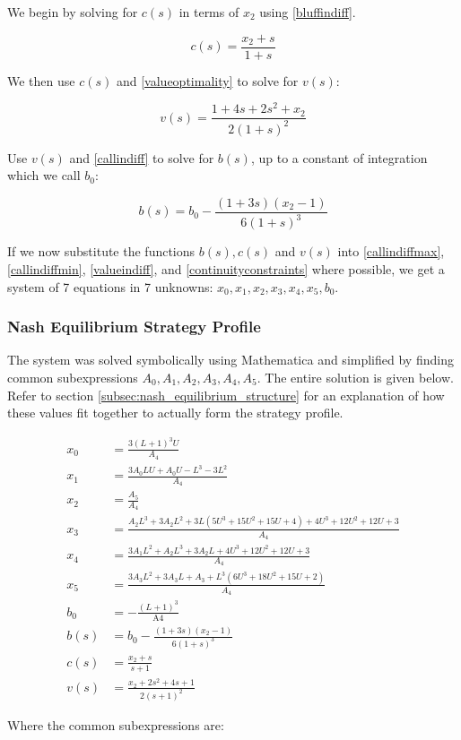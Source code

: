 \documentclass[a4paper,12pt]{article}
\theoremstyle{plain}
\theoremstyle{definition}
\begin{document}
We begin by solving for $c(s)$ in terms of $x_2$ using \ref{bluffindiff}. 

\[ c(s) = \frac{x_2 + s}{1+s} \]

We then use $c(s)$ and \ref{valueoptimality} to solve for $v(s)$:

\[ v(s) = \frac{1+4s+2s^2+x_2}{2(1+s)^2} \]

Use $v(s)$ and \ref{callindiff} to solve for $b(s)$, up to a constant of integration which we call $b_0$:

\[ b(s) = b_0 - \frac{(1+3s)(x_2-1)}{6(1+s)^3} \]

If we now substitute the functions $b(s), c(s)$ and $v(s)$ into \ref{callindiffmax}, \ref{callindiffmin}, \ref{valueindiff}, and \ref{continuityconstraints} where possible, we get a system of 7 equations in 7 unknowns: $x_0, x_1, x_2, x_3, x_4, x_5, b_0$. 

\subsubsection{Nash Equilibrium Strategy Profile}

The system was solved symbolically using Mathematica and simplified by finding common subexpressions $A_0, A_1, A_2, A_3, A_4, A_5$. The entire solution is given below. Refer to section \ref{subsec:nash_equilibrium_structure} for an explanation of how these values fit together to actually form the strategy profile.

\begin{align*}
    x_0 &= \frac{3 (L+1)^3 U}{A_4}\\
    x_1 &= \frac{3 A_0 L U+A_0 U-L^3-3 L^2}{A_4}\\
    x_2 &= \frac{A_5}{A_4}\\
    x_3 &= \frac{A_2 L^3+3 A_2 L^2+3 L \left(5 U^3+15 U^2+15 U+4\right)+4 U^3+12 U^2+12 U+3}{A_4}\\
    x_4 &= \frac{3 A_1 L^2+A_2 L^3+3 A_2 L+4 U^3+12 U^2+12 U+3}{A_4}\\
    x_5 &= \frac{3 A_3 L^2+3 A_3 L+A_3+L^3 \left(6 U^3+18 U^2+15 U+2\right)}{A_4}\\
    b_0 &= -\frac{(L+1)^3}{\text{A4}} \\ 
    b(s) &= b_0 - \frac{(1+3s)(x_2-1)}{6(1+s)^3}\\
    c(s) &= \frac{x_2+s}{s+1}\\
    v(s) &= \frac{x_2+2 s^2+4 s+1}{2 (s+1)^2}
\end{align*}

Where the common subexpressions are:
\end{document}
